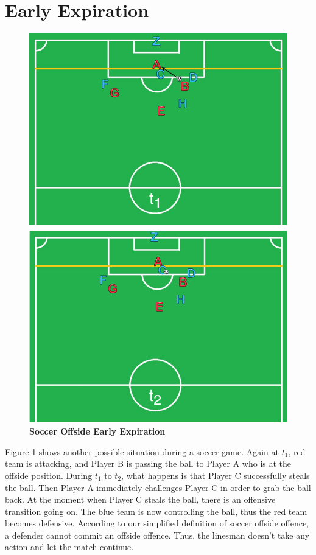 \section{Early Expiration}

\begin{figure}[!htbp]
	\centering
	\includegraphics[width=5in]{img/1-seex.pdf}
	\caption{\textbf{Soccer Offside Early Expiration}}
	\label{fig:1-seex} 
\end{figure}

Figure \ref{fig:1-seex} shows another possible situation during a soccer game. 
Again at $t_{1}$, red team is attacking, and Player B is passing the ball to Player A who is at the offside position.
During $t_{1}$ to $t_{2}$, what happens is that Player C successfully steals the ball.
Then Player A immediately challenges Player C in order to grab the ball back. 
At the moment when Player C steals the ball, there is an offensive transition going on.
The blue team is now controlling the ball, thus the red team becomes defensive. 
According to our simplified definition of soccer offside offence, a defender cannot commit an offside offence. 
Thus, the linesman doesn't take any action and let the match continue. 

